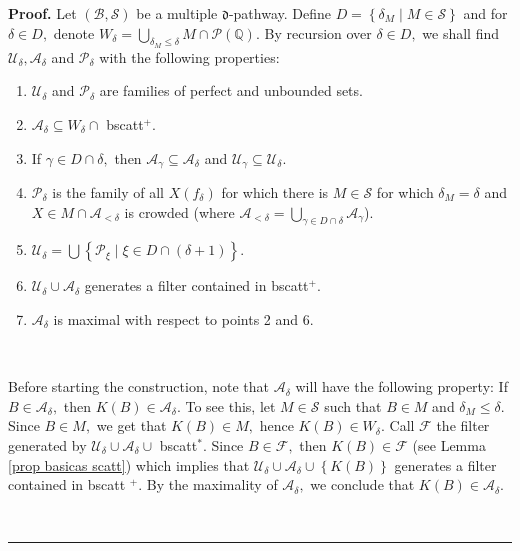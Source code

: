 \documentclass{article}%
\newenvironment{proof}[1][Proof]{\noindent\textbf{#1.} }{\ \rule{0.5em}{0.5em}}
\begin{document}
\begin{proof}
Let $\left(  \mathcal{B},\mathcal{S}\right)  $ be a multiple $\mathfrak{d}%
$-pathway. Define $D=\left\{  \delta_{M}\mid M\in\mathcal{S}\right\}  $ and
for $\delta\in D,$ denote $W_{\delta}=%
{\textstyle\bigcup\limits_{\delta_{M}\leq\delta}}
M\cap\mathcal{P}\left(  \mathbb{Q}\right)  .$ By recursion over $\delta\in D,$
we shall find $\mathcal{U}_{\delta},\mathcal{A}_{\delta}$ and $\mathcal{P}%
_{\delta}$ with the following properties:

\begin{enumerate}
\item $\mathcal{U}_{\delta}$ and $\mathcal{P}_{\delta}$ are families of
perfect and unbounded sets.

\item $\mathcal{A}_{\delta}\subseteq W_{\delta}\cap$ \textsf{bscatt}$^{+}.$

\item If $\gamma\in D\cap\delta,$ then $\mathcal{A}_{\gamma}\subseteq
\mathcal{A}_{\delta}$ and $\mathcal{U}_{\gamma}\subseteq\mathcal{U}_{\delta}.$

\item $\mathcal{P}_{\delta}$ is the family of all $X\left(  f_{\delta}\right)
$ for which there is $M\in\mathcal{S}$ for which $\delta_{M}=\delta$ and $X\in
M\cap\mathcal{A}_{<\delta}$ is crowded (where $\mathcal{A}_{<\delta}=%
{\textstyle\bigcup\limits_{\gamma\in D\cap\delta}}
\mathcal{A}_{\gamma}$).

\item $\mathcal{U}_{\delta}=%
{\textstyle\bigcup}
\left\{  \mathcal{P}_{\xi}\mid\xi\in D\cap\left(  \delta+1\right)  \right\}
.$

\item $\mathcal{U}_{\delta}\cup\mathcal{A}_{\delta}$ generates a filter
contained in \textsf{bscatt}$^{+}.$

\item $\mathcal{A}_{\delta}$ is maximal with respect to points 2 and 6.
\end{enumerate}

\qquad\ \ \ \qquad\ \ 

Before starting the construction, note that $\mathcal{A}_{\delta}$ will have
the following property: If $B\in\mathcal{A}_{\delta},$ then $K\left(
B\right)  \in\mathcal{A}_{\delta}.$ To see this, let $M\in\mathcal{S}$ such
that $B\in M$ and $\delta_{M}\leq\delta.$ Since $B\in M,$ we get that
$K\left(  B\right)  \in M,$ hence $K\left(  B\right)  \in W_{\delta}.$ Call
$\mathcal{F}$ the filter generated by $\mathcal{U}_{\delta}\cup\mathcal{A}%
_{\delta}\cup$ \textsf{bscatt}$^{\ast}$. Since $B\in\mathcal{F},$ then
$K\left(  B\right)  \in\mathcal{F}$ (see Lemma \ref{prop basicas scatt}) which
implies that $\mathcal{U}_{\delta}\cup\mathcal{A}_{\delta}\cup\left\{
K\left(  B\right)  \right\}  $ generates a filter contained in \textsf{bscatt}%
$^{+}.$ By the maximality of $\mathcal{A}_{\delta},$ we conclude that
$K\left(  B\right)  \in\mathcal{A}_{\delta}.$


\end{proof}
\end{document}
